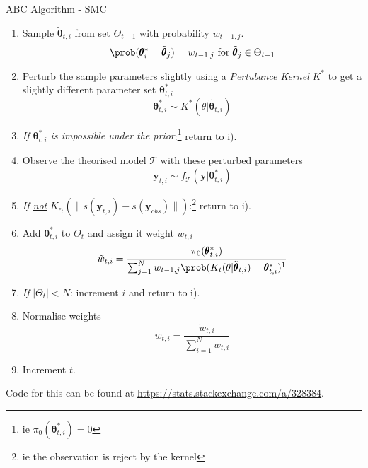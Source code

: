 \documentclass[11pt,a4paper]{article}
\begin{document}
\begin{proposition}{ABC Algorithm - SMC\cite{Delayed_Acceptance_ABC_SMC}\cite{youtube_ABC_intro}\cite{doi:10.1098/rsif.2008.0172}}
\begin{itemize}
      \begin{enumerate}
        \item Sample $\tilde{\pmb\theta}_{t,i}$ from set $\Theta_{t-1}$ with probability $w_{t-1,j}$.
          \[ \prob(\pmb\theta_i^*=\tilde{\pmb\theta}_j)=w_{t-1,j}\text{ for }\tilde{\pmb\theta}_j\in\Theta_{t-1} \]
        \item Perturb the sample parameters slightly using a \textit{Pertubance Kernel} $K^*$ to get a slightly different parameter set $\pmb\theta^*_{t,i}$
          \[ \pmb\theta^*_{t,i}\sim K^*(\theta|\tilde{\pmb\theta}_{t,i}) \]
        \item \textit{If $\pmb\theta^*_{t,i}$ is impossible under the prior}:\footnote{ie $\pi_0(\pmb\theta^*_{t,i})=0$} return to i).
        \item Observe the theorised model $\mathcal{T}$ with these perturbed parameters
          \[ \mathbf{y}_{t,i}\sim f_\mathcal{T}(\mathbf{y}|\pmb\theta^*_{t,i}) \]
        \item \textit{If \underline{not} }$K_{\epsilon_t}(\|s(\mathbf{y}_{t,i})-s(\mathbf{y}_{obs})\|)$:\footnote{ie the observation is reject by the kernel} return to i).
        \item Add $\pmb\theta_{t,i}^*$ to $\Theta_t$ and assign it weight $w_{t,i}$
        \[ \tilde{w}_{t,i}=\frac{\pi_0(\pmb\theta_{t,i}^*)}{\sum_{j=1}^Nw_{t-1,j}\prob(K_t(\theta|\tilde{\pmb\theta}_{t,i})=\pmb\theta_{t,i}^*)\footnotemark} \]
        \item \textit{If }$|\Theta_t|<N$: increment $i$ and return to i).
        \item Normalise weights
        \[ w_{t,i}=\frac{\tilde{w}_{t,i}}{\sum_{i=1}^Nw_{t,i}} \]
        \item Increment $t$.
      \end{enumerate}
    \end{itemize}
    Code for this can be found at \url{https://stats.stackexchange.com/a/328384}.
  \end{proposition}
\end{document}
